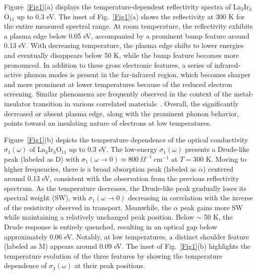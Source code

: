 \documentclass[prl,floatfix,twocolumn,superscriptaddress]{revtex4-2}
\begin{document}
Figure~\ref{Fig1}(a) displays the temperature-dependent reflectivity spectra of La$_3$Ir$_3$O$_{11}$ up to 0.3 eV. The inset of Fig.~\ref{Fig1}(a) shows the reflectivity at 300 K for the entire measured spectral range. At room temperature, the reflectivity exhibits a plasma edge below 0.05 eV, accompanied by a prominent bump feature around 0.13 eV. With decreasing temperature, the plasma edge shifts to lower energies and eventually disappears below 50 K, while the bump feature becomes more pronounced. In addition to these gross electronic features, a series of infrared-active phonon modes is present in the far-infrared region, which becomes sharper and more prominent at lower temperatures because of the reduced electron screening. Similar phenomena are frequently observed in the context of the metal-insulator transition in various correlated materials~\cite{Basov2005,Basov2011}. Overall, the significantly decreased or absent plasma edge, along with the prominent phonon behavior, points toward an insulating nature of electrons at low temperatures.

Figure~\ref{Fig1}(b) depicts the temperature dependence of the optical conductivity $\sigma_1(\omega)$ of La$_3$Ir$_3$O$_{11}$ up to 0.3 eV. The low-energy $\sigma_1(\omega)$ presents a Drude-like peak (labeled as D) with $\sigma_1(\omega \rightarrow 0) \simeq 800~\Omega^{-1}~\mathrm{cm}^{-1}$ at $T = 300$ K. Moving to higher frequencies, there is a broad absorption peak (labeled as $\alpha$) centered around 0.13 eV, consistent with the observation from the previous reflectivity spectrum. As the temperature decreases, the Drude-like peak gradually loses its spectral weight (SW), with $\sigma_1(\omega \rightarrow 0)$ decreasing in correlation with the inverse of the resistivity observed in transport. Meanwhile, the $\alpha$ peak gains more SW while maintaining a relatively unchanged peak position. Below $\sim$ 50 K, the Drude response is entirely quenched, resulting in an optical gap below approximately 0.06 eV. Notably, at low temperatures, a distinct shoulder feature (labeled as M) appears around 0.09 eV. The inset of Fig.~\ref{Fig1}(b) highlights the temperature evolution of the three features by showing the temperature dependence of $\sigma_1(\omega)$ at their peak positions.
\end{document}
